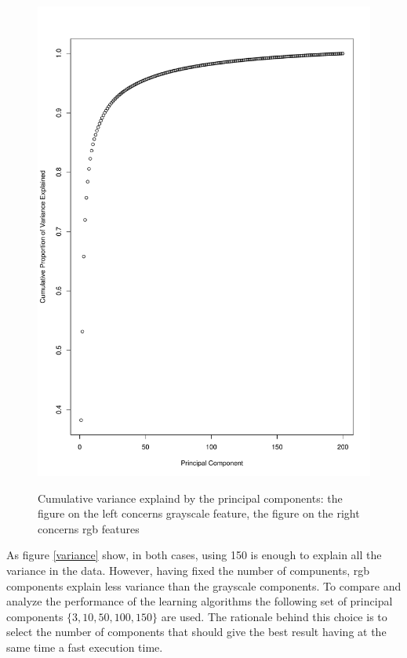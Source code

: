 \documentclass{article}
\begin{document}
\begin{figure}[H]
\begin{adjustwidth}{-4cm}{-4cm}
{    \includegraphics[scale=0.3]{../cumulative_variance_grb.pdf} 
     }
     \centering
     \caption{Cumulative variance explaind by the principal components: the figure on the left concerns grayscale feature, the figure on the right concerns rgb features}
      \end{adjustwidth}
   \end{figure}

\noindent As figure \ref{variance} show, in both cases, using 150 is enough to explain all the variance in the data. However, having fixed the number of compunents, rgb components explain less variance than the grayscale components. To compare and analyze the performance of the learning algorithms the following set of principal components $\{3,10,50,100,150\}$ are used. The rationale behind this choice is to select the number of components that should give the best result having at the same time a fast execution time. \\
 
\end{document}
